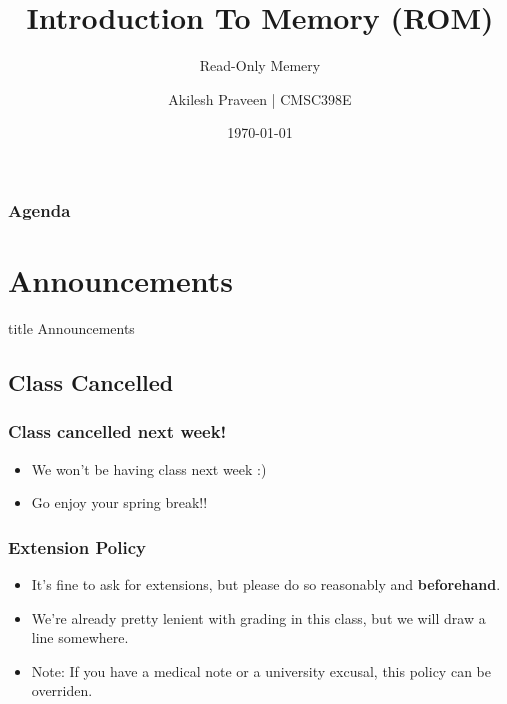\documentclass{beamer}
\title{Introduction To Memory (ROM)}
\subtitle{Read-Only Memery}
\author[CMSC389E]{Akilesh Praveen | CMSC398E}
\institute{UMD}
\date{\today}
\begin{document}
    \begin{frame}
        \titlepage
    \end{frame}
    
    \begin{frame}
        \frametitle{Agenda}
        \tableofcontents
    \end{frame}
    
    \section{Announcements}
    
        \begin{frame}
                \vfill
                \centering
                \begin{beamercolorbox}[sep=8pt,center,shadow=true,rounded=true]{title}
                    Announcements\par%
                \end{beamercolorbox}
                \vfill
             \end{frame}
    
        \subsection{Class Cancelled}
        
            
            
            \begin{frame}
                \frametitle{Class cancelled next week!}
                \begin{itemize}
                    \item We won't be having class next week :)
                    \item Go enjoy your spring break!!
                    
                \end{itemize}
            \end{frame}
            
            \begin{frame}
            	\frametitle{Extension Policy}
            	\begin{itemize}
            		\item It's fine to ask for extensions, but please do so reasonably and \textbf{beforehand}.
            		\item We're already pretty lenient with grading in this class, but we will draw a line somewhere.
            		\item Note: If you have a medical note or a university excusal, this policy can be overriden.
            	\end{itemize}
            \end{frame}
            
\end{document}
